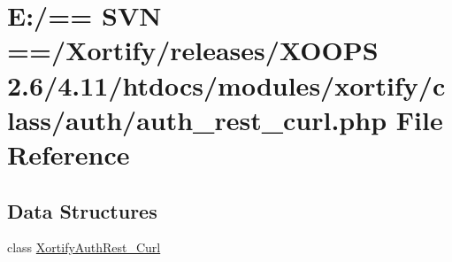 \hypertarget{auth__rest__curl_8php}{\section{E\-:/== S\-V\-N ==/\-Xortify/releases/\-X\-O\-O\-P\-S 2.6/4.11/htdocs/modules/xortify/class/auth/auth\-\_\-rest\-\_\-curl.php File Reference}
\label{auth__rest__curl_8php}
}
\subsection*{Data Structures}
\begin{DoxyCompactItemize}
\item 
class \hyperlink{class_xortify_auth_rest___curl}{Xortify\-Auth\-Rest\-\_\-\-Curl}
\end{DoxyCompactItemize}
